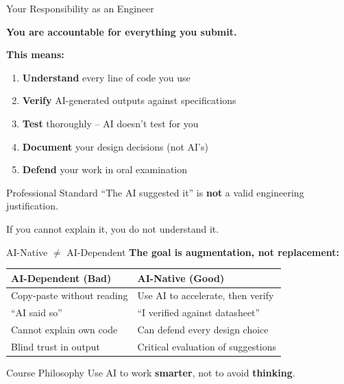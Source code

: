 \documentclass[aspectratio=169,11pt]{beamer}
\begin{document}
\begin{frame}{Your Responsibility as an Engineer}
    \begin{center}
        \Large
        \textbf{You are accountable for everything you submit.}
    \end{center}
    
    \vspace{0.5cm}
    \textbf{This means:}
    \begin{enumerate}
        \item \textbf{Understand} every line of code you use
        \item \textbf{Verify} AI-generated outputs against specifications
        \item \textbf{Test} thoroughly -- AI doesn't test for you
        \item \textbf{Document} your design decisions (not AI's)
        \item \textbf{Defend} your work in oral examination
    \end{enumerate}
    
    \vspace{0.3cm}
    \begin{alertblock}{Professional Standard}
        ``The AI suggested it'' is \textbf{not} a valid engineering justification.
        
        If you cannot explain it, you do not understand it.
    \end{alertblock}
\end{frame}

\begin{frame}{AI-Native $\neq$ AI-Dependent}
    \textbf{The goal is augmentation, not replacement:}
    
    \vspace{0.3cm}
    \begin{table}
        \centering
        \begin{tabular}{@{}p{5cm}p{6cm}@{}}
            \toprule
            \textbf{AI-Dependent (Bad)} & \textbf{AI-Native (Good)} \\
            \midrule
            Copy-paste without reading & Use AI to accelerate, then verify \\
            \addlinespace
            ``AI said so'' & ``I verified against datasheet'' \\
            \addlinespace
            Cannot explain own code & Can defend every design choice \\
            \addlinespace
            Blind trust in output & Critical evaluation of suggestions \\
            \bottomrule
        \end{tabular}
    \end{table}
    
    \vspace{0.3cm}
    \begin{block}{Course Philosophy}
        Use AI to work \textbf{smarter}, not to avoid \textbf{thinking}.
    \end{block}
\end{frame}
\end{document}
